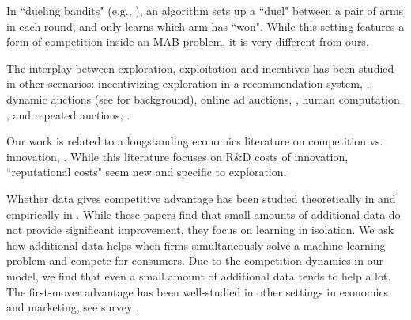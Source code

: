 \documentclass[../competing_bandits_with_appendix.tex]{subfiles}
\begin{document}
In ``dueling bandits" (e.g., \cite{Yue-dueling-icml09, Yue-dueling12}), an algorithm sets up a ``duel" between a pair of arms in each round, and only learns which arm has ``won". While this setting features a form of competition inside an MAB problem, it is very different from ours.


The interplay between exploration, exploitation and incentives has been studied in other scenarios: incentivizing exploration in a recommendation system,
    \eg \cite{Kremer-JPE14,Frazier-ec14,Che-13,ICexploration-ec15,Bimpikis-exploration-ms17},
dynamic auctions
    (see \cite{DynAuctions-survey10} for background),
online ad auctions, \eg
    \cite{MechMAB-ec09,DevanurK09,NSV08,Transform-ec10-jacm},
human computation
    \cite{RepeatedPA-ec14,Ghosh-itcs13,Krause-www13},
and repeated auctions, \eg
    \cite{Amin-auctions-nips13,Amin-auctions-nips14,Jieming-ec18}.


Our work is related to a longstanding economics literature on competition vs. innovation, \eg \cite{Schumpeter-42,barro2004economic,Aghion-QJE05}. While this literature focuses on R\&D costs of innovation, ``reputational costs" seem new and specific to exploration.


Whether data gives competitive advantage
has been studied theoretically in \cite{varian2018artificial,
  lambrecht2015can} and empirically in
\cite{bajari2018impact}.
While these papers find that small amounts
  of additional data do not provide significant improvement,
  they focus on learning in isolation.
We ask how additional data helps when firms simultaneously solve a machine learning problem and compete for consumers. Due to the competition dynamics in our model, we find that even a small amount of additional data tends to help a lot. The first-mover advantage has been well-studied in other settings in economics and marketing, see survey \cite{kerin1992first}.
\end{document}
